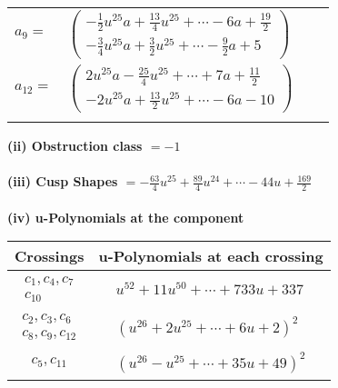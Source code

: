 \documentclass[1p]{elsarticle_modified}
\theoremstyle{definition}
\begin{document}
\begin{tabular}{m{7pt} m{180pt} m{7pt} m{180pt} }
\flushright $a_{9}=$&$\begin{pmatrix}-\frac{1}{2} u^{25} a+\frac{13}{4} u^{25}+\cdots-6 a+\frac{19}{2}\\-\frac{3}{4} u^{25} a+\frac{3}{2} u^{25}+\cdots-\frac{9}{2} a+5\end{pmatrix}$ \\
\flushright $a_{12}=$&$\begin{pmatrix}2 u^{25} a-\frac{25}{4} u^{25}+\cdots+7 a+\frac{11}{2}\\-2 u^{25} a+\frac{13}{2} u^{25}+\cdots-6 a-10\end{pmatrix}$\\&\end{tabular}
\flushleft \textbf{(ii) Obstruction class $= -1$}\\~\\
\flushleft \textbf{(iii) Cusp Shapes $= -\frac{63}{4} u^{25}+\frac{89}{4} u^{24}+\cdots-44 u+\frac{169}{2}$}\\~\\
\newpage\renewcommand{\arraystretch}{1}
\flushleft \textbf{(iv) u-Polynomials at the component}\newline \\
\begin{tabular}{m{50pt}|m{274pt}}
Crossings & \hspace{64pt}u-Polynomials at each crossing \\
\hline $$\begin{aligned}c_{1},c_{4},c_{7}\\c_{10}\end{aligned}$$&$\begin{aligned}
&u^{52}+11 u^{50}+\cdots+733 u+337
\end{aligned}$\\
\hline $$\begin{aligned}c_{2},c_{3},c_{6}\\c_{8},c_{9},c_{12}\end{aligned}$$&$\begin{aligned}
&(u^{26}+2 u^{25}+\cdots+6 u+2)^{2}
\end{aligned}$\\
\hline $$\begin{aligned}c_{5},c_{11}\end{aligned}$$&$\begin{aligned}
&(u^{26}- u^{25}+\cdots+35 u+49)^{2}
\end{aligned}$\\
\hline
\end{tabular}\\~\\
\end{document}
